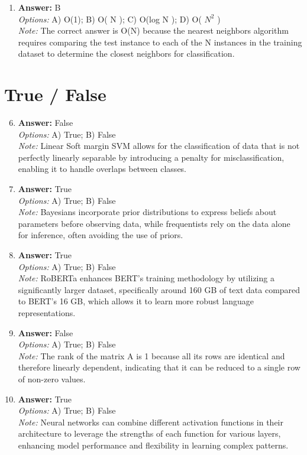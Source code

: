 \documentclass[12pt]{article}
\begin{document}
\begin{enumerate}[label=\arabic*.]
\item \textbf{Answer:} B
\\ \textit{Options:} A) O(1); B) O( N ); C) O(log N ); D) O( $N^2$ )
\\ \textit{Note:} The correct answer is O(N) because the nearest neighbors algorithm requires comparing the test instance to each of the N instances in the training dataset to determine the closest neighbors for classification.
\end{enumerate}

\section*{True / False}
\begin{enumerate}[label=\arabic*.]
\setcounter{enumi}{5}
\item \textbf{Answer:} False
\\ \textit{Options:} A) True; B) False
\\ \textit{Note:} Linear Soft margin SVM allows for the classification of data that is not perfectly linearly separable by introducing a penalty for misclassification, enabling it to handle overlaps between classes.
\item \textbf{Answer:} True
\\ \textit{Options:} A) True; B) False
\\ \textit{Note:} Bayesians incorporate prior distributions to express beliefs about parameters before observing data, while frequentists rely on the data alone for inference, often avoiding the use of priors.
\item \textbf{Answer:} True
\\ \textit{Options:} A) True; B) False
\\ \textit{Note:} RoBERTa enhances BERT's training methodology by utilizing a significantly larger dataset, specifically around 160 GB of text data compared to BERT's 16 GB, which allows it to learn more robust language representations.
\item \textbf{Answer:} False
\\ \textit{Options:} A) True; B) False
\\ \textit{Note:} The rank of the matrix A is 1 because all its rows are identical and therefore linearly dependent, indicating that it can be reduced to a single row of non-zero values.
\item \textbf{Answer:} True
\\ \textit{Options:} A) True; B) False
\\ \textit{Note:} Neural networks can combine different activation functions in their architecture to leverage the strengths of each function for various layers, enhancing model performance and flexibility in learning complex patterns.
\end{enumerate}
\end{document}
